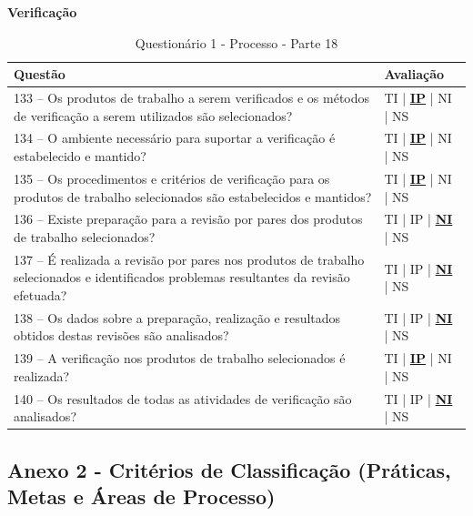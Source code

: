 \documentclass[openany,10pt,a4paper]{article}
\begin{document}
\begin{appendix}
	\begin{table}[H]
	\textbf{Verificação }
		\centering
		\caption{Questionário 1 - Processo - Parte 18}
		\begin{tabular}{|p{5in}p{1in}|}		
			\hline
			\textbf{Questão}  & \textbf{Avaliação}\\ 
			\hline
			133 – Os produtos de trabalho a serem verificados e os métodos de verificação a serem 
	utilizados são selecionados?
	 & TI | \underline{\textbf{IP}} | NI | NS \\
			\hline
			134 – O ambiente necessário para suportar a verificação é estabelecido e mantido?
	 & TI | \underline{\textbf{IP}} | NI | NS \\
			\hline
			135 – Os procedimentos e critérios de verificação para os produtos de trabalho selecionados são 
	estabelecidos e mantidos?
	 & TI | \underline{\textbf{IP}} | NI | NS \\
			\hline
			136 – Existe preparação para a revisão por pares dos produtos de trabalho selecionados?
	 & TI | IP | \underline{\textbf{NI}} | NS \\
			\hline
			137 – É realizada a revisão por pares nos produtos de trabalho selecionados e identificados 
	problemas resultantes da revisão efetuada?
	  & TI | IP | \underline{\textbf{NI}} | NS \\
			\hline
			138 – Os dados sobre a preparação, realização e resultados obtidos destas revisões são 
	analisados?
	 & TI | IP | \underline{\textbf{NI}} | NS \\
	 \hline
			139 – A verificação nos produtos de trabalho selecionados é realizada?
	 & TI | \underline{\textbf{IP}} | NI | NS \\
	  \hline
			140 – Os resultados de todas as atividades de verificação são analisados? 
	 & TI | IP | \underline{\textbf{NI}} | NS \\
			\hline
		\end{tabular} 
	\end{table}
	
\subsection{Anexo 2 - Critérios de Classificação (Práticas, Metas e Áreas de Processo)}\label{anexo_processo_classificacao}


\end{appendix}
\end{document}
